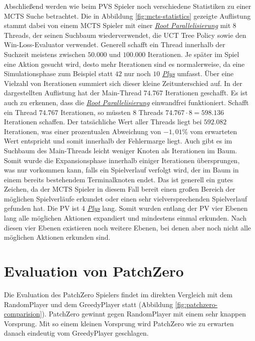 Abschließend werden wie beim \ac{PVS} Spieler noch verschiedene Statistiken zu einer \ac{MCTS} Suche betrachtet. Die in Abbildung \ref{fig:mcts-statistics} gezeigte Auflistung stammt dabei von einem \ac{MCTS} Spieler mit einer \hyperref[text:root-parallelization]{\emph{Root Parallelisierung}} mit 8 Threads, der seinen Suchbaum wiederverwendet, die \ac{UCT} Tree Policy sowie den Win-Loss-Evaluator verwendet. Generell schafft ein Thread innerhalb der Suchzeit meistens zwischen $50{.}000$ und $100{.}000$ Iterationen. Je später im Spiel eine Aktion gesucht wird, desto mehr Iterationen sind es normalerweise, da eine Simulationsphase zum Beispiel statt $42$ nur noch $10$ \hyperref[text:ply]{\emph{Plys}} umfasst. Über eine Vielzahl von Iterationen summiert sich dieser kleine Zeitunterschied auf. In der dargestellten Auflistung hat der Main-Thread $74{.}767$ Iterationen geschafft. Es ist auch zu erkennen, dass die \hyperref[text:root-parallelization]{\emph{Root Parallelisierung}} einwandfrei funktioniert. Schafft ein Thread $74{.}767$ Iterationen, so müssten 8 Threads $74{.}767 \cdot 8 = 598{.}136$ Iterationen schaffen. Der tatsächliche Wert aller Threads liegt bei $592{.}082$ Iterationen, was einer prozentualen Abweichung von $-1{,}01\%$ vom erwarteten Wert entspricht und somit innerhalb der Fehlermarge liegt. Auch gibt es im Suchbaum des Main-Threads leicht weniger Knoten als Iterationen im Baum. Somit wurde die Expansionsphase innerhalb einiger Iterationen übersprungen, was nur vorkommen kann, falls ein Spielverlauf verfolgt wird, der im Baum in einem bereits bestehendem Terminalknoten endet. Das ist generell ein gutes Zeichen, da der \ac{MCTS} Spieler in diesem Fall bereit einen großen Bereich der möglichen Spielverläufe erkundet oder einen sehr vielversprechenden Spielverlauf gefunden hat. Die \acl{PV} ist 4 \hyperref[text:ply]{\emph{Plys}} lang. Somit wurden entlang der \ac{PV} vier Ebenen lang alle möglichen Aktionen expandiert und mindestens einmal erkunden. Nach diesen vier Ebenen existieren noch weitere Ebenen, bei denen aber noch nicht alle möglichen Aktionen erkunden sind.

\section{Evaluation von PatchZero}

Die Evaluation des PatchZero Spielers findet im direkten Vergleich mit dem RandomPlayer und dem GreedyPlayer statt (Abbildung \ref{fig:patchzero-comparision}). PatchZero gewinnt gegen RandomPlayer mit einem sehr knappen Vorsprung. Mit so einem kleinen Vorsprung wird PatchZero wie zu erwarten danach eindeutig vom GreedyPlayer geschlagen.

